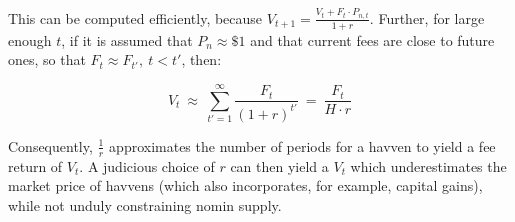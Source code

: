 \noindent This can be computed efficiently, because \(V_{t+1} = \frac{V_t + F_t \cdot P_{n,t}}{1 + r}\). 
Further, for large enough \(t\), if it is assumed that \(P_n \approx \$1\) and that current fees are close to
future ones, so that \(F_t \approx F_{t'}, \ t < t'\), then:

\vspace{2mm}

\begin{equation}
    V_t \ \approx \ \sum_{t'=1}^{\infty} \frac{F_t}{{(1 + r)}^{t'}} \ = \ \frac{F_t}{H \cdot r}
\end{equation}

\vspace{3mm}

\noindent Consequently, \(\frac{1}{r}\) approximates the number of periods for
a havven to yield a fee return of \(V_t\). A judicious choice of \(r\) can then
yield a \(V_t\) which underestimates the market price of havvens (which also
incorporates, for example, capital gains), while not unduly constraining
nomin supply.
